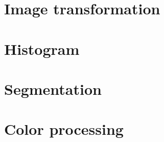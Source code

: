 \section{Image transformation}
\section{Histogram}
\section{Segmentation}
\section{Color processing}\label{color_model}

